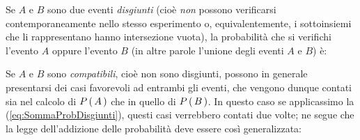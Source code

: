 Se $A$ e $B$ sono due eventi
{\itshape disgiunti} (cio\`e {\itshape non} possono verificarsi
contemporaneamente nello stesso esperimento o, equivalentemente, i sottoinsiemi
che li rappresentano hanno intersezione vuota), la probabilit\`a che si
verifichi l'evento $A$ oppure l'evento $B$ (in altre parole l'unione degli
eventi $A$ e $B$) \`e:

\begin{exemplify}


\end{exemplify}

\noindent Se $A$ e $B$ sono \emph{compatibili}, cio\`e non sono disgiunti,
possono in generale presentarsi dei casi favorevoli ad entrambi gli eventi, che
vengono dunque contati sia nel calcolo di $\displaystyle P\left(\, A \, \right)$ che in quello di
$\displaystyle P\left(\, B \, \right)$.
In questo caso se applicassimo la (\ref{eq:SommaProbDisgiunti}), questi
casi verrebbero contati due volte; ne segue che la legge dell'addizione
delle probabilit\`a deve essere cos\`i generalizzata:

